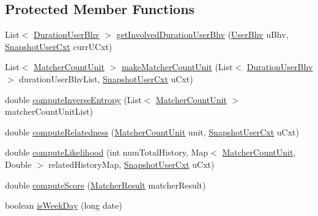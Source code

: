 \subsection*{\-Protected \-Member \-Functions}
\begin{DoxyCompactItemize}
\item 
\-List$<$ \hyperlink{classlab_1_1davidahn_1_1appshuttle_1_1collect_1_1bhv_1_1_duration_user_bhv}{\-Duration\-User\-Bhv} $>$ \hyperlink{classlab_1_1davidahn_1_1appshuttle_1_1predict_1_1matcher_1_1time_1_1_time_matcher_a902ae5d9c21e50a3db1c49e5be034bd8}{get\-Involved\-Duration\-User\-Bhv} (\hyperlink{interfacelab_1_1davidahn_1_1appshuttle_1_1collect_1_1bhv_1_1_user_bhv}{\-User\-Bhv} u\-Bhv, \hyperlink{classlab_1_1davidahn_1_1appshuttle_1_1collect_1_1_snapshot_user_cxt}{\-Snapshot\-User\-Cxt} curr\-U\-Cxt)
\item 
\-List$<$ \hyperlink{classlab_1_1davidahn_1_1appshuttle_1_1predict_1_1matcher_1_1_matcher_count_unit}{\-Matcher\-Count\-Unit} $>$ \hyperlink{classlab_1_1davidahn_1_1appshuttle_1_1predict_1_1matcher_1_1time_1_1_time_matcher_af349a420be679d9d1be3e34ba7a4cb1a}{make\-Matcher\-Count\-Unit} (\-List$<$ \hyperlink{classlab_1_1davidahn_1_1appshuttle_1_1collect_1_1bhv_1_1_duration_user_bhv}{\-Duration\-User\-Bhv} $>$ duration\-User\-Bhv\-List, \hyperlink{classlab_1_1davidahn_1_1appshuttle_1_1collect_1_1_snapshot_user_cxt}{\-Snapshot\-User\-Cxt} u\-Cxt)
\item 
double \hyperlink{classlab_1_1davidahn_1_1appshuttle_1_1predict_1_1matcher_1_1time_1_1_time_matcher_a81a7ce149aa48014fa07ca03aa5f9760}{compute\-Inverse\-Entropy} (\-List$<$ \hyperlink{classlab_1_1davidahn_1_1appshuttle_1_1predict_1_1matcher_1_1_matcher_count_unit}{\-Matcher\-Count\-Unit} $>$ matcher\-Count\-Unit\-List)
\item 
double \hyperlink{classlab_1_1davidahn_1_1appshuttle_1_1predict_1_1matcher_1_1time_1_1_time_matcher_a5156068d7a6fb6eaeb79005535bea95a}{compute\-Relatedness} (\hyperlink{classlab_1_1davidahn_1_1appshuttle_1_1predict_1_1matcher_1_1_matcher_count_unit}{\-Matcher\-Count\-Unit} unit, \hyperlink{classlab_1_1davidahn_1_1appshuttle_1_1collect_1_1_snapshot_user_cxt}{\-Snapshot\-User\-Cxt} u\-Cxt)
\item 
double \hyperlink{classlab_1_1davidahn_1_1appshuttle_1_1predict_1_1matcher_1_1time_1_1_time_matcher_ad1f4a383478fce9ca18d3c363bd7dd49}{compute\-Likelihood} (int num\-Total\-History, \-Map$<$ \hyperlink{classlab_1_1davidahn_1_1appshuttle_1_1predict_1_1matcher_1_1_matcher_count_unit}{\-Matcher\-Count\-Unit}, \-Double $>$ related\-History\-Map, \hyperlink{classlab_1_1davidahn_1_1appshuttle_1_1collect_1_1_snapshot_user_cxt}{\-Snapshot\-User\-Cxt} u\-Cxt)
\item 
double \hyperlink{classlab_1_1davidahn_1_1appshuttle_1_1predict_1_1matcher_1_1time_1_1_time_matcher_a3f17275ef78859372c4631f4e5c61430}{compute\-Score} (\hyperlink{classlab_1_1davidahn_1_1appshuttle_1_1predict_1_1matcher_1_1_matcher_result}{\-Matcher\-Result} matcher\-Result)
\item 
boolean \hyperlink{classlab_1_1davidahn_1_1appshuttle_1_1predict_1_1matcher_1_1time_1_1_time_matcher_a22588eada0f0714a22d504922a13e427}{is\-Week\-Day} (long date)
\end{DoxyCompactItemize}


